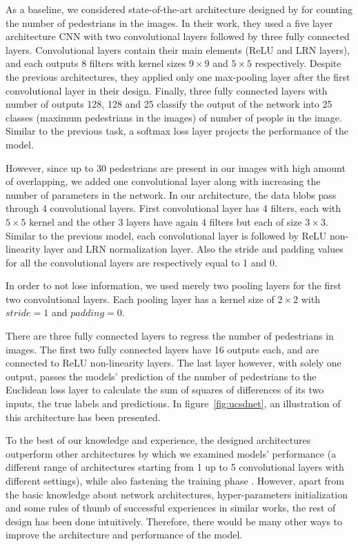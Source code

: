 As a baseline, we considered state-of-the-art architecture designed by \citealt*{segui2015learning} for counting the number of pedestrians in the images. In their work, they used a five layer architecture CNN with two convolutional layers followed by three fully connected layers. Convolutional layers contain their main elements (ReLU and LRN layers), and each outputs 8 filters with kernel sizes $9\times9$ and $5\times5$ respectively. Despite the previous architectures, they applied only one max-pooling layer after the first convolutional layer in their design. Finally, three fully connected layers with number of outputs 128, 128 and 25 classify the output of the network into 25 classes (maximum pedestrians in the images) of number of people in the image. Similar to the previous task, a softmax loss layer projects the performance of the model.   

\noindent However, since up to 30 pedestrians are present in our images with high amount of overlapping, we added one convolutional layer along with increasing the number of parameters in the network. In our architecture, the data blobs pass through 4 convolutional layers. First convolutional layer has 4 filters, each with $5\times5$ kernel and the other 3 layers have again 4 filters but each of size $3\times3$. Similar to the previous model, each convolutional layer is followed by ReLU non-linearity layer and LRN normalization layer. Also the stride and padding values for all the convolutional layers are respectively equal to 1 and 0. 

\indent In order to not lose information, we used merely two pooling layers for the first two convolutional layers. Each pooling layer has a kernel size of $2\times2$ with $stride = 1$  and $padding = 0$. 

There are three fully connected layers to regress the number of pedestrians in images. The first two fully connected layers have 16 outputs each, and are connected to ReLU non-linearity layers. The last layer however, with solely one output, passes the models' prediction of the number of pedestrians to the Euclidean loss layer to calculate the sum of squares of differences of its two inputs, the true labels and predictions. In figure~\ref{fig:ucsdnet}, an illustration of this architecture has been presented.

To the best of our knowledge and experience, the designed architectures outperform other architectures by which we examined models' performance (a different range of architectures starting from 1 up to 5 convolutional layers with different settings), while also fastening the training phase . However, apart from the basic knowledge about network architectures, hyper-parameters initialization and some rules of thumb of successful experiences in similar works, the rest of design has been done intuitively. Therefore, there would be many other ways to improve the architecture and performance of the model.  


